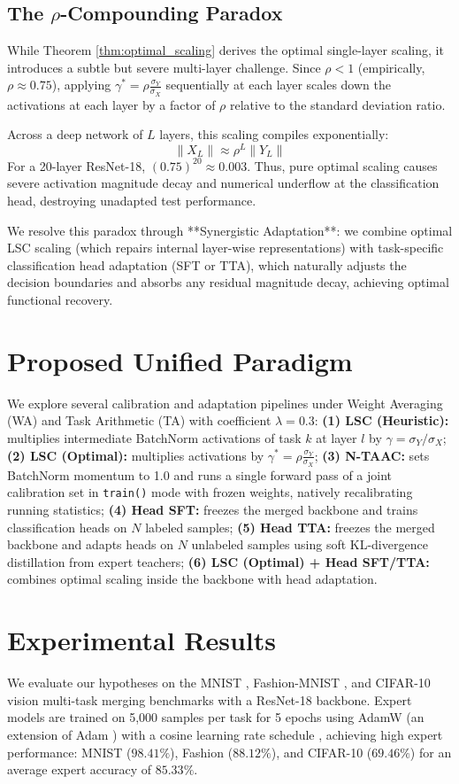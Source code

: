 \documentclass{article}
\theoremstyle{plain}
\theoremstyle{definition}
\theoremstyle{remark}
\begin{document}
\subsection{The $\rho$-Compounding Paradox}
While Theorem \ref{thm:optimal_scaling} derives the optimal single-layer scaling, it introduces a subtle but severe multi-layer challenge. Since $\rho < 1$ (empirically, $\rho \approx 0.75$), applying $\gamma^* = \rho \frac{\sigma_Y}{\sigma_X}$ sequentially at each layer scales down the activations at each layer by a factor of $\rho$ relative to the standard deviation ratio.

Across a deep network of $L$ layers, this scaling compiles exponentially:
$$\|X_L\| \approx \rho^L \|Y_L\|$$
For a 20-layer ResNet-18, $(0.75)^{20} \approx 0.003$. Thus, pure optimal scaling causes severe activation magnitude decay and numerical underflow at the classification head, destroying unadapted test performance.

We resolve this paradox through **Synergistic Adaptation**: we combine optimal LSC scaling (which repairs internal layer-wise representations) with task-specific classification head adaptation (SFT or TTA), which naturally adjusts the decision boundaries and absorbs any residual magnitude decay, achieving optimal functional recovery.

\section{Proposed Unified Paradigm}
We explore several calibration and adaptation pipelines under Weight Averaging (WA) and Task Arithmetic (TA) with coefficient $\lambda = 0.3$: \textbf{(1) LSC (Heuristic):} multiplies intermediate BatchNorm activations of task $k$ at layer $l$ by $\gamma = \sigma_Y / \sigma_X$; \textbf{(2) LSC (Optimal):} multiplies activations by $\gamma^* = \rho \frac{\sigma_Y}{\sigma_X}$; \textbf{(3) N-TAAC:} sets BatchNorm momentum to 1.0 and runs a single forward pass of a joint calibration set in \texttt{train()} mode with frozen weights, natively recalibrating running statistics; \textbf{(4) Head SFT:} freezes the merged backbone and trains classification heads on $N$ labeled samples; \textbf{(5) Head TTA:} freezes the merged backbone and adapts heads on $N$ unlabeled samples using soft KL-divergence distillation from expert teachers; \textbf{(6) LSC (Optimal) + Head SFT/TTA:} combines optimal scaling inside the backbone with head adaptation.

\section{Experimental Results}
We evaluate our hypotheses on the MNIST \cite{lecun1998gradient}, Fashion-MNIST \cite{xiao2017fashion}, and CIFAR-10 \cite{krizhevsky2009learning} vision multi-task merging benchmarks with a ResNet-18 backbone. Expert models are trained on 5,000 samples per task for 5 epochs using AdamW \cite{loshchilov2017decoupled} (an extension of Adam \cite{kingma2014adam}) with a cosine learning rate schedule \cite{loshchilov2016sgdr}, achieving high expert performance: MNIST ($98.41\%$), Fashion ($88.12\%$), and CIFAR-10 ($69.46\%$) for an average expert accuracy of $85.33\%$.
\end{document}

